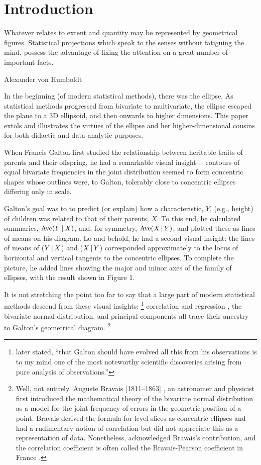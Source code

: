 \section{Introduction}

\epigraph{Whatever relates to extent and quantity may be represented by
geometrical figures. Statistical projections which speak to the senses without
fatiguing the mind, possess the advantage of fixing the attention on a great
number of important facts.}{Alexander von Humboldt \citeyearpar[p.~ciii]{Humboldt:1811a}}

In the beginning (of modern  statistical methods), there was the  ellipse. As statistical
methods progressed from bivariate to multivariate, the ellipse escaped the plane to a 3D
ellipsoid, and then onwards to higher dimensions.
This  paper extols and illustrates the
virtues of the ellipse and her higher-dimensional cousins for both didactic and
data analytic purposes.

When
Francis Galton  \citeyearpar{Galton:1886} first  studied the  relationship between  heritable traits of
parents and their offspring, he  had a remarkable visual insight--- contours of
equal bivariate frequencies in the joint distribution seemed to form  concentric
shapes whose outlines  were, to Galton,  tolerably close to  concentric ellipses
differing only in scale.

Galton's goal was to  to predict (or explain)  how a characteristic, $Y$,   (e.g.,
height) of children was  related to that of  their parents, $X$.  To  this end, he
calculated summaries,  $\mathrm{Ave}(Y\, | \, X)$,  and, for  symmetry, $\mathrm{Ave}(X\, | \, Y)$, and plotted
these as lines of means on his  diagram.  Lo and behold, he had a  second visual
insight:  the lines  of means of  ($Y\, | \, X$) and ($X\, | \, Y$)  corresponded approximately to
the locus of  horizontal and vertical  tangents to the  concentric ellipses.  To
complete the picture,  he added lines  showing the major  and minor axes  of the
family of ellipses, with the result shown in Figure 1.

It is  not stretching  the point  too far  to say  that a  large part  of modern
statistical  methods  descend  from  these  visual  insights:%
\footnote{\citet[p. 37]{Pearson:1920} later stated, ``that Galton
should have evolved all this from his observations is to my mind one
of the most noteworthy scientific discoveries arising from pure
analysis of observations.'' }
correlation   and
regression \citep{Pearson:1896}, the  bivariate normal  distribution,
and principal components  \citep{Pearson:1901,Hotelling:1933}  all trace their ancestry to Galton's  geometrical
diagram.%
\footnote{
Well, not entirely. Auguste Bravais [1811--1863] \citeyearpar{Bravais:1846}, an astronomer
and physicist first introduced the mathematical theory of the bivariate normal distribution
as a model for the joint frequency of errors in the geometric position of a point.
Bravais derived the formula for level slices as concentric ellipses and had a rudimentary
notion of correlation but did not appreciate this as a representation of data.
Nonetheless, \cite{Pearson:1920} acknowledged Bravais's contribution, and the correlation
coefficient is often called the Bravais-Pearson coefficient in France
\citep{Denis:2001}. }


